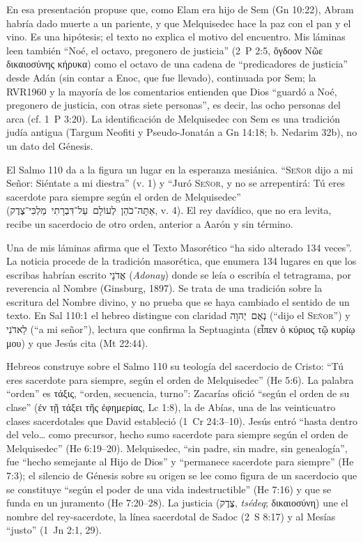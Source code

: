 \documentclass[11pt,letterpaper]{article}
\newcommand{\heb}[1]{\mbox{\foreignlanguage{hebrew}{#1}}}
\newcommand{\grc}[1]{\foreignlanguage{ancientgreek}{#1}}
\newcommand{\SENOR}{\textsc{Señor}}
\begin{document}
\begin{nota}[Precisión]
En esa presentación propuse que, como Elam era hijo de Sem (Gn 10:22), Abram habría dado muerte a un pariente, y que Melquisedec hace la paz con el pan y el vino. Es una hipótesis; el texto no explica el motivo del encuentro. Mis láminas leen también ``Noé, el octavo, pregonero de justicia'' (2~P 2:5, \grc{ὄγδοον Νῶε δικαιοσύνης κήρυκα}) como el octavo de una cadena de ``predicadores de justicia'' desde Adán (sin contar a Enoc, que fue llevado), continuada por Sem; la RVR1960 y la mayoría de los comentarios entienden que Dios ``guardó a Noé, pregonero de justicia, con otras siete personas'', es decir, las ocho personas del arca (cf. 1~P 3:20). La identificación de Melquisedec con Sem es una tradición judía antigua (Targum Neofiti y Pseudo-Jonatán a Gn 14:18; b. Nedarim 32b), no un dato del Génesis.
\end{nota}

El Salmo 110 da a la figura un lugar en la esperanza mesiánica. ``\SENOR{} dijo a mi Señor: Siéntate a mi diestra'' (v. 1) y ``Juró \SENOR, y no se arrepentirá: Tú eres sacerdote para siempre según el orden de Melquisedec'' (\heb{אַתָּה־כֹהֵן לְעוֹלָם עַל־דִּבְרָתִי מַלְכִּי־צֶדֶק}, v. 4). El rey davídico, que no era levita, recibe un sacerdocio de otro orden, anterior a Aarón y sin término.

\begin{nota}
Una de mis láminas afirma que el Texto Masorético ``ha sido alterado 134 veces''. La noticia procede de la tradición masorética, que enumera 134 lugares en que los escribas habrían escrito \heb{אֲדֹנָי} (\emph{Adonay}) donde se leía o escribía el tetragrama, por reverencia al Nombre (Ginsburg, 1897). Se trata de una tradición sobre la escritura del Nombre divino, y no prueba que se haya cambiado el sentido de un texto. En Sal 110:1 el hebreo distingue con claridad \heb{נְאֻם יְהוָה} (``dijo el \SENOR'') y \heb{לַאדֹנִי} (``a mi señor''), lectura que confirma la Septuaginta (\grc{εἶπεν ὁ κύριος τῷ κυρίῳ μου}) y que Jesús cita (Mt 22:44).
\end{nota}

Hebreos construye sobre el Salmo 110 su teología del sacerdocio de Cristo: ``Tú eres sacerdote para siempre, según el orden de Melquisedec'' (He 5:6). La palabra ``orden'' es \grc{τάξις}, ``orden, secuencia, turno'': Zacarías ofició ``según el orden de su clase'' (\grc{ἐν τῇ τάξει τῆς ἐφημερίας}, Lc 1:8), la de Abías, una de las veinticuatro clases sacerdotales que David estableció (1~Cr 24:3--10). Jesús entró ``hasta dentro del velo\ldots{} como precursor, hecho sumo sacerdote para siempre según el orden de Melquisedec'' (He 6:19--20). Melquisedec, ``sin padre, sin madre, sin genealogía'', fue ``hecho semejante al Hijo de Dios'' y ``permanece sacerdote para siempre'' (He 7:3); el silencio de Génesis sobre su origen se lee como figura de un sacerdocio que se constituye ``según el poder de una vida indestructible'' (He 7:16) y que se funda en un juramento (He 7:20--28). La justicia (\heb{צֶדֶק}, \emph{tsédeq}; \grc{δικαιοσύνη}) une el nombre del rey-sacerdote, la línea sacerdotal de Sadoc (2~S 8:17) y al Mesías ``justo'' (1~Jn 2:1, 29).
\end{document}
